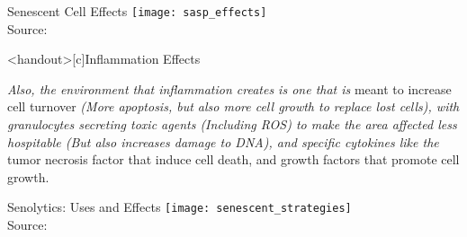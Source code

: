 \begin{frame}[c]{Senescent Cell Effects}
    \texttt{[image: sasp\_effects]} \\
    Source: \cite{malaquin2016keeping}
\end{frame}


\begin{frame}<handout>[c]{Inflammation Effects}
    \begin{aquote}{\cite{NintilTh68:online}}
        {\em Also, the environment that inflammation creates is one that is} meant to
        increase cell turnover {\em (More apoptosis, but also more cell growth to
        replace lost cells), with granulocytes secreting toxic agents
        (Including ROS) to make the area affected less hospitable (But also
        increases damage to DNA), and specific cytokines like the} tumor
        necrosis factor that induce cell death, and growth factors that promote
        cell growth.
    \end{aquote}
\end{frame}

\begin{frame}[c]{Senolytics: Uses and Effects} 
    \texttt{[image: senescent\_strategies]} \\
    Source: \cite{paez2019targeting}
\end{frame}

